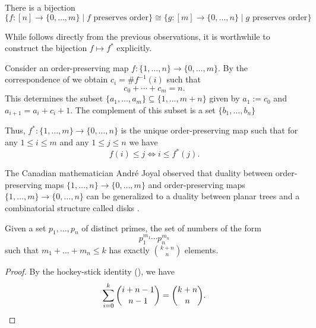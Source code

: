 \begin{corollary}\label{corollary:transposing-order-preserving-maps}
  There is a bijection
  \begin{equation*}
    \{f:[n]\to\{0,\ldots,m\}\mid f\text{ preserves order}\} \cong
    \{g:[m]\to\{0,\ldots,n\}\mid g\text{ preserves order}\}
  \end{equation*}
\end{corollary}

\begin{remark}
  While  follows directly from the previous observations, it is worthwhile to construct the bijection $f\mapsto f^\ast$ explicitly.

  Consider an order-preserving map $f:\{1,\ldots,n\}\to\{0,\ldots,m\}$. By the correspondence of  we obtain $c_i=\#f^{-1}(i)$ such that
  \begin{equation*}
    c_0+\cdots + c_m=n. 
  \end{equation*}
  This determines the subset $\{a_1,\ldots,a_m\}\subseteq\{1,\ldots,m+n\}$ given by $a_1:= c_0$ and $a_{i+1}=a_i+c_i+1$. The complement of this subset is a set $\{b_1,\ldots,b_n\}$

  Thus, $f^\ast : \{1,\ldots,m\}\to\{0,\ldots,n\}$ is the unique order-preserving map such that for any $1\leq i\leq m$ and any $1\leq j\leq n$ we have
  \begin{equation*}
    f(i)\leq j \Leftrightarrow i \leq f^\ast(j).
  \end{equation*}

  The Canadian mathematician Andr\'e Joyal observed that duality between order-preserving maps $\{1,\ldots,n\}\to\{0,\ldots,m\}$ and order-preserving maps $\{1,\ldots,m\}\to\{0,\ldots,n\}$ can be generalized to a duality between planar trees and a combinatorial structure called disks \cite{joyal1997}.
\end{remark}

\begin{theorem}\label{theorem:stars-and-bars-primes}
  Given a set $p_1,\ldots,p_n$ of distinct primes, the set of numbers of the form
  \begin{equation*}
    p_1^{m_1}\cdots p_n^{m_n}
  \end{equation*}
  such that $m_1+\ldots+m_n\leq k$ has exactly $\binom{k+n}{n}$ elements.
\end{theorem}

\begin{proof}
  By the hockey-stick identity (), we have
  \begin{equation*}
    \sum_{i=0}^k\binom{i+n-1}{n-1}=\binom{k+n}{n}.\qedhere
  \end{equation*}
\end{proof}


